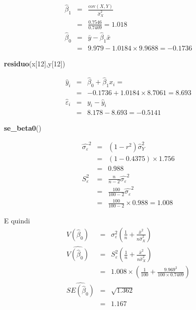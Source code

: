 \documentclass[
  11pt,
]{book}
\newenvironment{Shaded}{\begin{snugshade}}{\end{snugshade}}
\newcommand{\DecValTok}[1]{\textcolor[rgb]{0.00,0.00,0.81}{#1}}
\newcommand{\FunctionTok}[1]{\textcolor[rgb]{0.13,0.29,0.53}{\textbf{#1}}}
\newcommand{\NormalTok}[1]{#1}
\theoremstyle{mytheoremstyle}
\theoremstyle{mydefstyle}
\begin{document}
\begin{eqnarray*}
       \hat\beta_1 &=& \frac{\text{cov}(X,Y)}{\hat\sigma_X^2} \\
            &=& \frac{ 0.7546 }{ 0.7409 }  =  1.018 \\
      \hat\beta_0 &=& \bar y - \hat\beta_1 \bar x\\
          &=&  9.979 - 1.0184 \times  9.9688 = -0.1736 
      \end{eqnarray*}

\begin{Shaded}
\begin{Highlighting}[]
\FunctionTok{residuo}\NormalTok{(x[}\DecValTok{12}\NormalTok{],y[}\DecValTok{12}\NormalTok{])}
\end{Highlighting}
\end{Shaded}

\begin{eqnarray*}
\hat y_i &=&\hat\beta_0+\hat\beta_1 x_i=\\ 
&=& -0.1736 + 1.0184 \times 8.7061 = 8.693 \\ 
\hat \varepsilon_i &=& y_i-\hat y_i\\ 
&=& 8.178 - 8.693 = -0.5141  
\end{eqnarray*}

\begin{Shaded}
\begin{Highlighting}[]
\FunctionTok{se\_beta0}\NormalTok{()}
\end{Highlighting}
\end{Shaded}

\begin{eqnarray*}
\hat{\sigma_\varepsilon}^2&=&(1-r^2)\hat\sigma_Y^2\\
&=& (1- 0.4375 )\times 1.756 \\
   &=&  0.988 \\
   S_\varepsilon^2 &=& \frac{n} {n-2} \hat{\sigma_\varepsilon}^2\\
   &=&  \frac{ 100 } { 100 -2} \hat{\sigma_\varepsilon}^2 \\
 &=&  \frac{ 100 } { 100 -2} \times  0.988  =  1.008  
\end{eqnarray*}

E quindi\begin{eqnarray*}
V(\hat\beta_{0}) &=& \sigma_{\varepsilon}^{2} \left( \frac{1} {n}  +  \frac{\bar{x}^{2}} {n \hat{\sigma}^{2}_{X}} \right)\\
\widehat{V(\hat\beta_{0})} &=& S_{\varepsilon}^{2}\left( \frac{1} {n}  +  \frac{\bar{x}^{2}} {n \hat{\sigma}^{2}_{X}} \right)\ \\
 &=&  1.008 \times\left( \frac{1} { 100 }  +  \frac{ 9.969 ^{2}} { 100 \times  0.7409 } \right)\\
 \widehat{SE(\hat\beta_{0})}        &=&  \sqrt{ 1.362 }\\
 &=&  1.167 
\end{eqnarray*}
\end{document}
